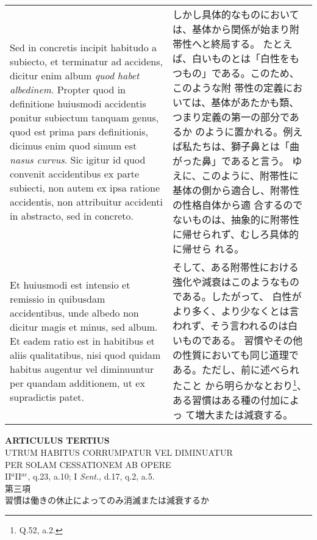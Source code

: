 \documentclass[10pt]{jsarticle} %
\begin{document}
\begin{longtable}{p{21em}p{21em}}
\\

Sed in concretis incipit habitudo a subiecto, et terminatur ad
accidens, dicitur enim album {\itshape quod habet albedinem}.  Propter
quod in definitione huiusmodi accidentis ponitur subiectum tanquam
genus, quod est prima pars definitionis, dicimus enim quod simum est
{\itshape nasus curvus}. Sic igitur id quod convenit accidentibus ex
parte subiecti, non autem ex ipsa ratione accidentis, non attribuitur
accidenti in abstracto, sed in concreto.

&

しかし具体的なものにおいては、基体から関係が始まり附帯性へと終局する。
たとえば、白いものとは「白性をもつもの」である。このため、このような附
帯性の定義においては、基体があたかも類、つまり定義の第一の部分であるか
のように置かれる。例えば私たちは、獅子鼻とは「曲がった鼻」であると言う。
ゆえに、このように、附帯性に基体の側から適合し、附帯性の性格自体から適
合するのでないものは、抽象的に附帯性に帰せられず、むしろ具体的に帰せら
れる。

\\


Et huiusmodi est intensio et remissio in quibusdam accidentibus, unde
albedo non dicitur magis et minus, sed album. Et eadem ratio est in
habitibus et aliis qualitatibus, nisi quod quidam habitus augentur vel
diminuuntur per quandam additionem, ut ex supradictis patet.

&

そして、ある附帯性における強化や減衰はこのようなものである。したがって、
白性がより多く、より少なくとは言われず、そう言われるのは白いものである。
習慣やその他の性質においても同じ道理である。ただし、前に述べられたこと
から明らかなとおり\footnote{Q.52, a.2.}、ある習慣はある種の付加によっ
て増大または減衰する。




\end{longtable}
\newpage



\begin{center}
{\Large {\bf ARTICULUS TERTIUS}}\\ {\large UTRUM HABITUS CORRUMPATUR
VEL DIMINUATUR\\PER SOLAM CESSATIONEM AB OPERE }\\ {\footnotesize
II$^{a}$II$^{ae}$, q.23, a.10; I {\itshape Sent.}, d.17, q.2, a.5.}\\
{\Large 第三項\\習慣は働きの休止によってのみ消滅または減衰するか}
\end{center}
\end{document}
